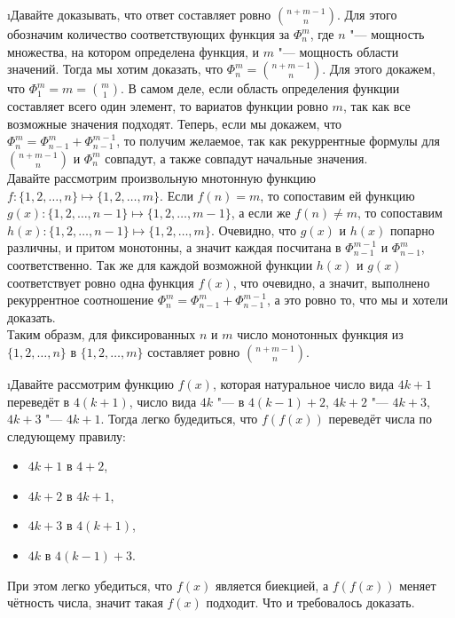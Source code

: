 \i Давайте доказывать, что ответ составляет ровно $\binom{n+m-1}{n}$. Для этого обозначим количество соответствующих функция за $\Phi_n^m$, где $n$ "--- мощность множества, на котором определена функция, и $m$ "--- мощность области значений. Тогда мы хотим доказать, что $\Phi_n^m = \binom{n+m-1}{n}$. Для этого докажем, что $\Phi_1^m = m = \binom{m}{1}$. В самом деле, если область определения функции составляет всего один элемент, то вариатов функции ровно $m$, так как все возможные значения подходят. Теперь, если мы докажем, что $\Phi_n^m = \Phi_{n-1}^m + \Phi_{n-1}^{m-1}$, то получим желаемое, так как рекуррентные формулы для $\binom{n+m-1}{n}$ и $\Phi^m_n$ совпадут, а также совпадут начальные значения.\\
Давайте рассмотрим произвольную мнотонную функцию $f: \{1, 2, \ldots, n\} \mapsto \{1, 2, \ldots, m\}$. Если $f(n) = m$, то сопоставим ей функцию $g(x): \{1, 2, \ldots, n-1\} \mapsto \{1, 2, \ldots, m-1\}$, а если же $f(n) \ne m$, то сопоставим $h(x): \{1, 2, \ldots, n-1\} \mapsto \{1, 2, \ldots, m\}$. Очевидно, что $g(x)$ и $h(x)$ попарно различны, и притом монотонны, а значит каждая посчитана в $\Phi_{n-1}^{m-1}$ и $\Phi_{n-1}^{m}$, соответственно. Так же для каждой возможной функции $h(x)$ и $g(x)$ соответствует ровно одна функция $f(x)$, что очевидно, а значит, выполнено рекуррентное соотношение $\Phi_n^m = \Phi_{n-1}^m + \Phi_{n-1}^{m-1}$, а это ровно то, что мы и хотели доказать.\\
Таким образм, для фиксированных $n$ и $m$ число монотонных функция из $\{1, 2, \ldots, n\}$ в $\{1, 2, \ldots, m\}$ составляет ровно $\binom{n+m-1}{n}$. 

\i Давайте рассмотрим функцию $f(x)$, которая натуральное число вида $4k+1$ переведёт в $4(k+1)$, число вида $4k$ "--- в $4(k-1)+2$, $4k+2$ "--- $4k+3$, $4k+3$ "--- $4k+1$. Тогда легко будедиться, что $f(f(x))$ переведёт числа по следующему правилу:
\begin{itemize}
    \item $4k+1$ в $4 + 2$,
    \item $4k+2$ в $4k+1$,
    \item $4k+3$ в $4(k+1)$,
    \item $4k$ в $4(k-1)+3$.
\end{itemize}
При этом легко убедиться, что $f(x)$ является биекцией, а $f(f(x))$ меняет чётность числа, значит такая $f(x)$ подходит. Что и требовалось доказать.

